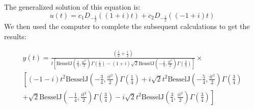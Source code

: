 \documentclass{article}
\begin{document}
The generalized solution of this equation is:
\[
u(t) = c_1 D_{-\frac{1}{2}} \left( (1 + i)t \right) + c_2 D_{-\frac{1}{2}} \left( (-1 + i)t \right)
\]
We then used the computer to complete the subsequent calculations to get the results:

\begin{multline}
y(t) = \frac{\left( \frac{1}{2} + \frac{i}{2} \right)}{t \left[ \text{BesselJ}\left(\frac{1}{4}, \frac{it^2}{2}\right) \Gamma\left(\frac{1}{4}\right) - (1 + i)\sqrt{2} \text{BesselJ}\left(-\frac{1}{4}, \frac{it^2}{2}\right) \Gamma\left(\frac{3}{4}\right) \right]} \times \\
\left[ (-1 - i) t^2 \text{BesselJ}\left(-\frac{3}{4}, \frac{it^2}{2}\right) \Gamma\left(\frac{1}{4}\right) + i\sqrt{2} t^2 \text{BesselJ}\left(-\frac{5}{4}, \frac{it^2}{2}\right) \Gamma\left(\frac{3}{4}\right) \right. \\
\left. + \sqrt{2} \text{BesselJ}\left(-\frac{1}{4}, \frac{it^2}{2}\right) \Gamma\left(\frac{3}{4}\right) - i\sqrt{2} t^2 \text{BesselJ}\left(\frac{3}{4}, \frac{it^2}{2}\right) \Gamma\left(\frac{3}{4}\right) \right]
\end{multline}

\clearpage
\end{document}
